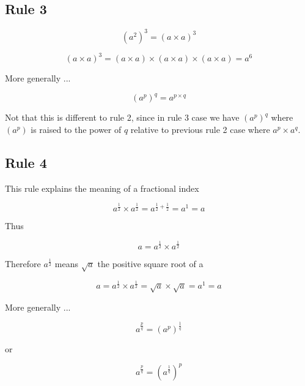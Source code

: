 \subsection{Rule 3}

\begin{equation}
 (a^{2})^{3}  = (a \times a)^{3}
\end{equation}

\begin{equation}
(a \times a)^{3} = (a \times a) \times (a \times a) \times (a \times a)= a^{6}
\end{equation}

More generally ...

\begin{equation}
(a^{p})^{q} = a^{p \times q}
\end{equation}

Not that this is different to rule 2, since in rule 3 case we have $ (a^{p})^{q} $ where $ (a^{p})$ is raised to the power of $q$ relative to previous rule 2 case where $ a^{p} \times a^{q} $.

\subsection{Rule 4}

This rule explains the meaning of a fractional index

\begin{equation}
a^{\frac{1}{2}} \times a^{\frac{1}{2}} = a^{\frac{1}{2} + \frac{1}{2}} = a^{1} = a 
\end{equation}

Thus

\begin{equation}
a = a^{\frac{1}{2}} \times a^{\frac{1}{2}}  
\end{equation}

Therefore $a^{\frac{1}{2}}$ means $\sqrt{a} $ the positive square root of a 

\begin{equation}
a = a^{\frac{1}{2}} \times a^{\frac{1}{2}}  = \sqrt{a} \times \sqrt{a} = a^{1} = a
\end{equation}

More generally ...

\begin{equation}
a^{\frac{p}{q}} = (a^{p})^{\frac{1}{q}} 
\end{equation}

or

\begin{equation}
a^{\frac{p}{q}} = (a^{\frac{1}{q}})^{p}
\end{equation}

